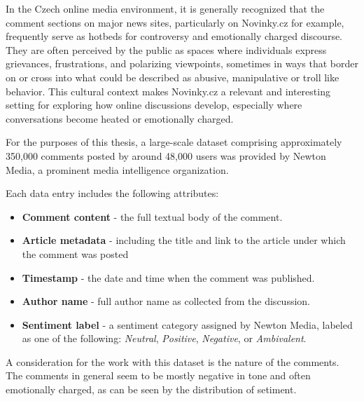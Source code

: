 \documentclass[twoside]{ctuthesis}
\theoremstyle{plain}
\theoremstyle{definition}
\theoremstyle{note}
\begin{document}
In the Czech online media environment, it is generally recognized that the comment sections on major news sites, particularly on Novinky.cz for example, frequently serve as hotbeds for controversy and emotionally charged discourse. They are often perceived by the public as spaces where individuals express grievances, frustrations, and polarizing viewpoints, sometimes in ways that border on or cross into what could be described as abusive, manipulative or troll like behavior. This cultural context makes Novinky.cz a relevant and interesting setting for exploring how online discussions develop, especially where conversations become heated or emotionally charged.\par

For the purposes of this thesis, a large-scale dataset comprising approximately 350,000 comments posted by around 48,000 users was provided by Newton Media, a prominent media intelligence organization.\par 

Each data entry includes the following attributes:
\begin{itemize}
    \item \textbf{Comment content} - the full textual body of the comment.
    
    \item \textbf{Article metadata} - including the title and link to the article under which the comment was posted
    
    \item \textbf{Timestamp} - the date and time when the comment was published.
    
    \item \textbf{Author name} - full author name as collected from the discussion.
    
    \item \textbf{Sentiment label} - a sentiment category assigned by Newton Media, labeled as one of the following: \textit{Neutral}, \textit{Positive}, \textit{Negative}, or \textit{Ambivalent}.
\end{itemize}

A consideration for the work with this dataset is the nature of the comments. The comments in general seem to be mostly negative in tone and often emotionally charged, as can be seen by the distribution of setiment.
\end{document}

